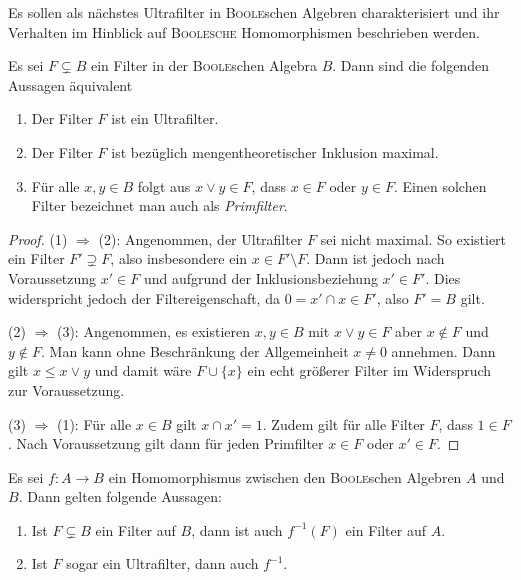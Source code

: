 Es sollen als nächstes Ultrafilter in \textsc{Boole}schen Algebren charakterisiert und ihr Verhalten im Hinblick auf \textsc{Boolesche} Homomorphismen beschrieben werden.

\begin{prop}
  \label{prop:ultrafilterchar}
  Es sei $F \subsetneq B$ ein Filter in der \textsc{Boole}schen Algebra $B$. Dann sind die folgenden Aussagen äquivalent
  \begin{enumerate}[(1)]
    \item Der Filter $F$ ist ein Ultrafilter.
    \item Der Filter $F$ ist bezüglich mengentheoretischer Inklusion maximal.
    \item Für alle $x,y \in B$ folgt aus $x \lor y \in F$, dass $x \in F$ oder $y \in F$. Einen solchen Filter bezeichnet man auch als \emph{Primfilter}.
  \end{enumerate}
\end{prop}

\begin{proof}
  (1) $\Rightarrow$ (2):
  Angenommen, der Ultrafilter $F$ sei nicht maximal. 
  So existiert ein Filter $F' \supsetneq F$, also insbesondere ein $x \in F' \setminus F$.
  Dann ist jedoch nach Voraussetzung $x' \in F$ und aufgrund der Inklusionsbeziehung $x' \in F'$.
  Dies widerspricht jedoch der Filtereigenschaft, da $0 = x' \cap x \in F'$, also $F' = B$ gilt.

  (2) $\Rightarrow$ (3):
  Angenommen, es existieren $x,y \in B$ mit $x \lor y \in F$ aber $x \not\in F$ und $y \not\in F$.
  Man kann ohne Beschränkung der Allgemeinheit $x \neq 0$ annehmen.
  Dann gilt $x \leq x \lor y$ und damit wäre $F \cup \{x\}$ ein echt größerer Filter im Widerspruch zur Voraussetzung.

  (3) $\Rightarrow$ (1):
  Für alle $x \in B$ gilt $x \cap x' = 1$.
  Zudem gilt für alle Filter $F$, dass $1 \in F$.
  Nach Voraussetzung gilt dann für jeden Primfilter $x \in F$ oder $x' \in F$.
\end{proof}

\begin{lem}
  \label{lem:boolehomfilters}
  Es sei $f \colon A \to B$ ein Homomorphismus zwischen den \textsc{Boole}schen Algebren $A$ und $B$.
  Dann gelten folgende Aussagen:
  \begin{enumerate}[(1)]
    \item Ist $F \subsetneq B$ ein Filter auf $B$, dann ist auch $f^{-1}(F)$ ein Filter auf $A$.
    \item Ist $F$ sogar ein Ultrafilter, dann auch $f^{-1}$.
  \end{enumerate}
\end{lem}

